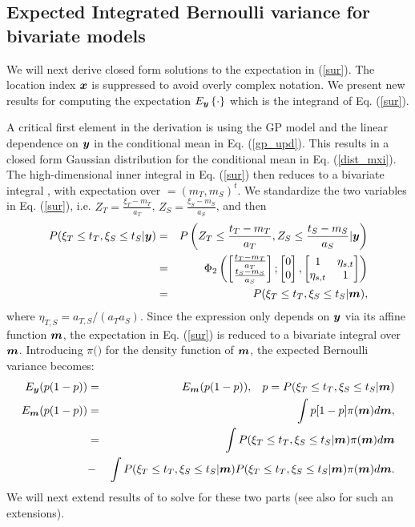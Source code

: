 \documentclass[aoas]{imsart}
\begin{document}
\subsection{Expected Integrated Bernoulli variance for bivariate models}

We will next derive closed form solutions to the expectation in
(\ref{sur}). The location index ${\boldsymbol x}$ is suppressed to avoid overly
complex notation. We present new results for computing the expectation
$E_{{\boldsymbol y}}\left\{ \cdot \right\}$ which is the integrand of
Eq. (\ref{sur}).

A critical first element in the derivation is using the GP model and the
linear dependence on ${\boldsymbol y}$ in the conditional mean in
Eq. (\ref{gp_upd}). This results in a closed form Gaussian
distribution for the conditional mean in Eq. (\ref{dist_mxi}). The
high-dimensional inner integral in Eq. (\ref{sur}) then reduces to a
bivariate integral \citep{bhattacharjya2013value, chevalier2014fast},
with expectation over $\bm=(m_{T},m_{S})^t$.  We standardize the two
variables in Eq. (\ref{sur}), i.e.  $Z_T=\frac{\xi_T-m_{T}}{a_{T}}$,
$Z_S=\frac{\xi_S-m_{S}}{a_{S}}$, and then
\begin{eqnarray}\label{ytom}
   P(\xi_T \leq t_T, \xi_S \leq t_S|\by) &=& P \left( Z_T \leq\frac{t_T-m_{T}}{a_{T}}, Z_S \leq\frac{t_S-m_{S}}{a_{S}}|\by \right) \nonumber \\
   &=& \Phi_2 \begin{pmatrix} 
\begin{bmatrix} \frac{t_T-m_{T}}{a_{T}}\\
\frac{t_S-m_{S}}{a_{S}}
\end{bmatrix};
 \begin{bmatrix} 0\\
0
\end{bmatrix},\begin{bmatrix}
1 & \eta_{s,t}  \\
\eta_{s,t}   & 1  
\end{bmatrix}\end{pmatrix} \nonumber \\
&=& P(\xi_T \leq t_T, \xi_S \leq t_S|\bm),
\end{eqnarray}
where $\eta_{T,S} =a_{T,S}/(a_{T} a_{S})$.
Since the expression only depends on ${\boldsymbol y}$ via its affine function ${\boldsymbol m}$, the expectation in Eq. (\ref{sur}) is reduced to a bivariate integral over ${\boldsymbol m}$. 
Introducing $\pi(\bm)$ for the density
function of ${\boldsymbol m}$, the expected Bernoulli variance becomes:
\begin{eqnarray}\label{eq:var2}
E_{\by}(p(1-p)) &=& E_{\bm}(p(1-p)), \hspace{3mm} p=P(\xi_T \leq t_T, \xi_S \leq t_S|\bm) \nonumber \\
E_{\bm}(p(1-p)) & = & \int p[1-p] \pi(\bm) d\bm, \nonumber \\
 &=& \int P(\xi_T \leq t_T, \xi_S \leq t_S|\bm)  \pi(\bm) d\bm \nonumber  \\
&-& \int P(\xi_T \leq t_T, \xi_S \leq t_S|\bm) P(\xi_T \leq t_T, \xi_S \leq t_S|\bm) \pi(\bm) d\bm. 
\end{eqnarray}
We will next extend results of \cite{chevalier2014fast} to solve for
these two parts (see also \cite{stroh} for such an extensions).
\end{document}
